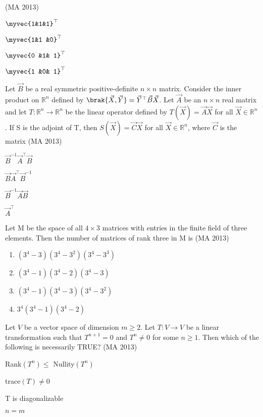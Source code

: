     \hfill (MA 2013)
    \begin{enumerate}
    \begin{multicols}{4}
        \item $\myvec{1&1&1}^{\top}$
        \item $\myvec{1&1 &0}^{\top}$
        \item $\myvec{0 &1& 1}^{\top}$
        \item $\myvec{1 &0& 1}^{\top}$
    \end{multicols}
    \end{enumerate}
    \item Let $\vec{B}$ be a real symmetric positive-definite $n \times n$ matrix. Consider the inner product on $\mathbb{R}^n$ defined by $\brak{ \vec{X}, \vec{Y} } = \vec{Y}^{\top} \vec{B}\vec{X}$. Let $\vec{A}$ be an $n \times n$ real matrix and let $T: \mathbb{R}^n \rightarrow \mathbb{R}^n$ be the linear operator defined by $T(\vec{X}) = \vec{A}\vec{X}$ for all $\vec{X} \in \mathbb{R}^n$. If S is the adjoint of T, then $S(\vec{X}) = \vec{C}\vec{X}$ for all $\vec{X} \in \mathbb{R}^n$, where $\vec{C}$ is the matrix
    \hfill (MA 2013)
    \begin{enumerate}
    \begin{multicols}{4}
        \item $\vec{B}^{-1}\vec{A}^{\top} \vec{B}$
        \item $\vec{B} \vec{A}^{\top} \vec{B}^{-1}$
        \item $\vec{B}^{-1}\vec{A}\vec{B}$
        \item $\vec{A}^{\top}$
    \end{multicols}
    \end{enumerate}
    \item Let M be the space of all $4 \times 3$ matrices with entries in the finite field of three elements. Then the number of matrices of rank three in M is
    \hfill (MA 2013)
    \begin{enumerate}
        \item $(3^4-3)(3^4-3^2)(3^4-3^3)$
        \item $(3^4-1)(3^4-2)(3^4-3)$
        \item $(3^4-1)(3^4-3)(3^4-3^2)$
        \item $3^4(3^4-1)(3^4-2)$
    \end{enumerate}
    \item Let $V$ be a vector space of dimension $m \ge 2$. Let $T: V \rightarrow V$ be a linear transformation such that $T^{n+1}=0$ and $T^n \neq 0$ for some $n \ge 1$. Then which of the following is necessarily TRUE?
    \hfill (MA 2013)
    \begin{enumerate}
    \begin{multicols}{2}
        \item Rank$(T^n) \le$ Nullity$(T^n)$
        \item trace$(T) \neq 0$
        \item T is diagonalizable
        \item $n=m$
    \end{multicols}
    \end{enumerate}

